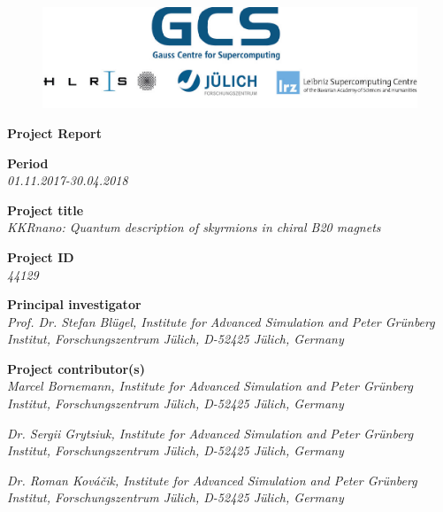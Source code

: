 \documentclass [a4paper, 12pt]{article}
\begin{document}
 
\begin{figure}[H]
\begin{center}
  \includegraphics[scale=0.45]{Figures/GCS-hlrs-fzj-lrz.jpg}\\
\end{center}
\end{figure}

\begin{center}
{\LARGE \bf Project Report} \\

\bigskip
\bigskip
\bigskip
\end{center}
\textbf{Period}\\
\phantom{MM}\textit{01.11.2017-30.04.2018}

\bigskip
\textbf{Project title}\\
\phantom{MM}\textit{KKRnano: Quantum description of skyrmions in chiral B20 magnets}


\bigskip
\textbf{Project ID}\\
\phantom{MM} \textit{44129}

\bigskip
\textbf{Principal investigator}\\
\phantom{MM} \textit{ Prof. Dr. Stefan Bl{\"u}gel,
Institute for Advanced Simulation and Peter Gr\"unberg Institut, Forschungszentrum J\"ulich, D-52425 J\"ulich, Germany
}

\bigskip
\textbf{Project contributor(s)}\\

\phantom{MM} \textit{Marcel Bornemann,
Institute for Advanced Simulation and Peter Gr\"unberg Institut, Forschungszentrum J\"ulich, D-52425 J\"ulich, Germany
}

\phantom{MM} \textit{Dr. Sergii Grytsiuk,
Institute for Advanced Simulation and Peter Gr\"unberg Institut, Forschungszentrum J\"ulich, D-52425 J\"ulich, Germany
}

\phantom{MM} \textit{Dr. Roman Kováčik,
Institute for Advanced Simulation and Peter Gr\"unberg Institut, Forschungszentrum J\"ulich, D-52425 J\"ulich, Germany
}
\end{document}
